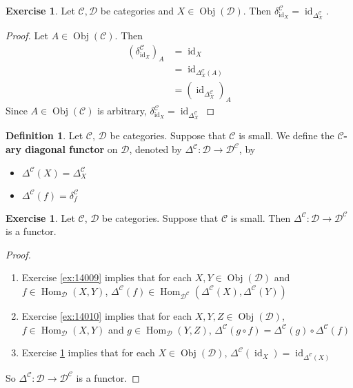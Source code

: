 \documentclass{book}
\theoremstyle{definition}
\newtheorem{defn}[definition]{Definition}
\newtheorem{ex}[definition]{Exercise}
\newcommand{\del}{\delta}
\newcommand{\Del}{\Delta}
\newcommand{\MC}{\mathcal{C}}
\newcommand{\MD}{\mathcal{D}}
\newcommand{\lex}[1]{\label{ex:#1}}
\newcommand{\rex}[1]{Exercise \ref{ex:#1}}
\newcommand{\ld}[1]{\label{defn:#1}}
\DeclareMathOperator{\id}{id}
\DeclareMathOperator{\Obj}{Obj}
\DeclareMathOperator{\Hom}{Hom}
\DeclareMathOperator*{\0}{\mbf{0}}
\DeclareMathOperator*{\1}{\mbf{1}}
\begin{document}
	\begin{ex} \lex{14011}
		Let $\MC, \MD$ be categories and $X \in \Obj(\MD)$. Then $\del^{\MC}_{\id_X} = \id_{\Del^{\MC}_X}$.
	\end{ex}

	\begin{proof}
		Let $A \in \Obj(\MC)$. Then 
		\begin{align*}
			(\del^{\MC}_{\id_X})_A
			& = \id_X \\
			& = \id_{\Del^{\MC}_X(A)} \\
			& = (\id_{\Del^{\MC}_X})_A 
		\end{align*}
		Since $A \in \Obj(\MC)$ is arbitrary, $\del^{\MC}_{\id_X} = \id_{\Del^{\MC}_X}$
	\end{proof}

	\begin{defn} \ld{14011}
		Let $\MC$, $\MD$ be categories. Suppose that $\MC$ is small. We define the \textbf{$\MC$-ary diagonal functor} on $\MD$, denoted by $\Del^{\MC}: \MD \rightarrow \MD^{\MC}$, by
		\begin{itemize}
			\item $\Del^{\MC}(X) = \Del^{\MC}_X$
			\item $\Del^{\MC}(f) = \del^{\MC}_f$
		\end{itemize}
	\end{defn}

	\begin{ex} \lex{14012}
		Let $\MC$, $\MD$ be categories. Suppose that $\MC$ is small. Then $\Del^{\MC}: \MD \rightarrow \MD^{\MC}$ is a functor.
	\end{ex}

	\begin{proof}\
		\begin{enumerate}
			\item \rex{14009} implies that for each $X, Y \in \Obj(\MD)$ and $f \in \Hom_{\MD}(X, Y)$, $\Del^{\MC}(f) \in \Hom_{\MD^{\MC}} (\Del^{\MC}(X), \Del^{\MC}(Y))$
			\item \rex{14010} implies that for each $X, Y, Z \in \Obj(\MD)$, $f \in \Hom_{\MD}(X, Y)$ and $g \in \Hom_{\MD}(Y, Z)$, $\Del^{\MC}(g \circ f) = \Del^{\MC}(g) \circ \Del^{\MC}(f)$
			\item \rex{14011} implies that for each $X \in \Obj(\MD)$, $\Del^{\MC}(\id_X) = \id_{\Del^{\MC}(X)}$
		\end{enumerate}
		 So $\Del^{\MC} : \MD \rightarrow \MD^{\MC}$ is a functor.
	\end{proof}
\end{document}
